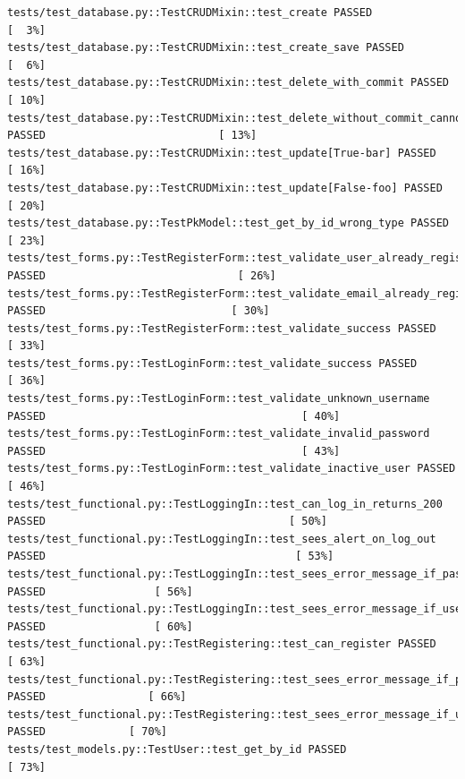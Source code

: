 \documentclass[10pt]{article}
\begin{document}
\begin{Verbatim}[fontsize=\scriptsize]
tests/test_database.py::TestCRUDMixin::test_create PASSED                                                        [  3%]
tests/test_database.py::TestCRUDMixin::test_create_save PASSED                                                   [  6%]
tests/test_database.py::TestCRUDMixin::test_delete_with_commit PASSED                                            [ 10%]
tests/test_database.py::TestCRUDMixin::test_delete_without_commit_cannot_access PASSED                           [ 13%]
tests/test_database.py::TestCRUDMixin::test_update[True-bar] PASSED                                              [ 16%]
tests/test_database.py::TestCRUDMixin::test_update[False-foo] PASSED                                             [ 20%]
tests/test_database.py::TestPkModel::test_get_by_id_wrong_type PASSED                                            [ 23%]
tests/test_forms.py::TestRegisterForm::test_validate_user_already_registered PASSED                              [ 26%]
tests/test_forms.py::TestRegisterForm::test_validate_email_already_registered PASSED                             [ 30%]
tests/test_forms.py::TestRegisterForm::test_validate_success PASSED                                              [ 33%]
tests/test_forms.py::TestLoginForm::test_validate_success PASSED                                                 [ 36%]
tests/test_forms.py::TestLoginForm::test_validate_unknown_username PASSED                                        [ 40%]
tests/test_forms.py::TestLoginForm::test_validate_invalid_password PASSED                                        [ 43%]
tests/test_forms.py::TestLoginForm::test_validate_inactive_user PASSED                                           [ 46%]
tests/test_functional.py::TestLoggingIn::test_can_log_in_returns_200 PASSED                                      [ 50%]
tests/test_functional.py::TestLoggingIn::test_sees_alert_on_log_out PASSED                                       [ 53%]
tests/test_functional.py::TestLoggingIn::test_sees_error_message_if_password_is_incorrect PASSED                 [ 56%]
tests/test_functional.py::TestLoggingIn::test_sees_error_message_if_username_doesnt_exist PASSED                 [ 60%]
tests/test_functional.py::TestRegistering::test_can_register PASSED                                              [ 63%]
tests/test_functional.py::TestRegistering::test_sees_error_message_if_passwords_dont_match PASSED                [ 66%]
tests/test_functional.py::TestRegistering::test_sees_error_message_if_user_already_registered PASSED             [ 70%]
tests/test_models.py::TestUser::test_get_by_id PASSED                                                            [ 73%]

\end{Verbatim}
\end{document}

